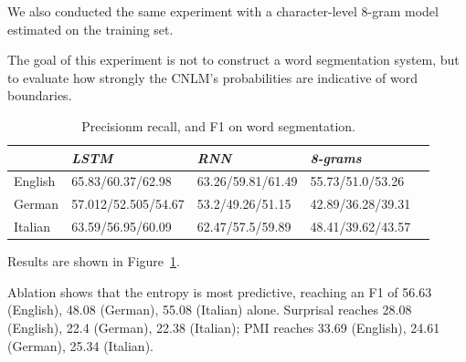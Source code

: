 We also conducted the same experiment with a character-level 8-gram model estimated on the training set.

The goal of this experiment is not to construct a word segmentation system, but to evaluate how strongly the CNLM's probabilities are indicative of word boundaries.


\begin{table}[t]
  \begin{center}
    \begin{tabular}{l|l|l|l|l}
      \multicolumn{1}{c}{}&\emph{LSTM}&\emph{RNN}&\emph{8-grams}\\
      \hline
      English & 65.83/60.37/62.98 &   63.26/59.81/61.49 & 55.73/51.0/53.26    \\ %
      German &  57.012/52.505/54.67 &  53.2/49.26/51.15 & 42.89/36.28/39.31   \\ %
      Italian &  63.59/56.95/60.09 & 62.47/57.5/59.89  & 48.41/39.62/43.57    \\ %
    \end{tabular}
  \end{center}
  \caption{\label{tab:segmentation-results} Precisionm recall, and F1 on word segmentation.}
\end{table}

Results are shown in Figure~\ref{tab:segmentation-results}.


Ablation shows that the entropy is most predictive, reaching an F1 of 56.63 (English), 48.08 (German), 55.08 (Italian) alone.
Surprisal reaches 28.08 (English), 22.4 (German), 22.38 (Italian); PMI reaches 33.69 (English), 24.61 (German), 25.34 (Italian).

